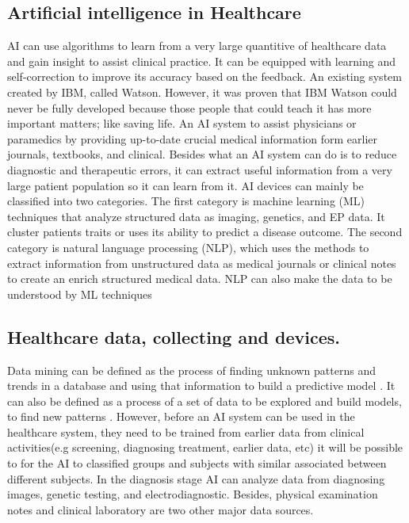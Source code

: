 \documentclass[fleqn,10pt]{wlscirep}
\begin{document}
\subsection{Artificial intelligence in Healthcare}
 AI can use algorithms to learn from a very large quantitive of healthcare data and gain insight to assist clinical practice. It can be equipped with learning and self-correction to improve its accuracy based on the feedback. An existing system created by IBM\cite{Kilde8}, called Watson. However, it was proven that IBM Watson could never be fully developed because those people that could teach it has more important matters; like saving life\cite{Kilde22}. An AI system to assist physicians or paramedics by providing up-to-date crucial medical information form earlier journals, textbooks, and clinical. Besides what an AI system can do is to reduce diagnostic and therapeutic errors, it can extract useful information from a very large patient population so it can learn from it. AI devices can mainly be classified into two categories. The first category is machine learning (ML) techniques that analyze structured data as imaging, genetics, and EP data. It cluster patients traits or uses its ability to predict a disease outcome\cite{Kilde9}. The second category is natural language processing (NLP), which uses the methods to extract information from unstructured data as medical journals or clinical notes to create an enrich structured medical data. NLP can also make the data to be understood by ML techniques \cite{Kilde10}

\subsection{Healthcare data, collecting and devices.}

Data mining can be defined as the process of finding unknown patterns and trends in a database and using that information to build a predictive model \cite{Kilde17}. It can also be defined as a process of a set of data to be explored and build models, to find new patterns \cite{Kilde18}. However, before an AI system can be used in the healthcare system, they need to be trained from earlier data from clinical activities(e.g screening, diagnosing treatment, earlier data, etc) it will be possible to for the AI to classified groups and subjects with similar associated between different subjects. In the diagnosis stage AI can analyze data from diagnosing images, genetic testing, and electrodiagnostic. Besides, physical examination notes and clinical laboratory are two other major data sources. 
\end{document}
